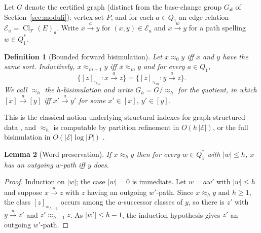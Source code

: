 \documentclass[11pt]{article}
\newtheorem{definition}{Definition}[section]
\newtheorem{lemma}[definition]{Lemma}
\newcommand{\Cl}{\operatorname{Cl}}
\newcommand{\T}{\mathcal{T}}
\begin{document}
Let $G$ denote the certified graph (distinct from the base-change group $G_{\bm d}$ of Section~\ref{sec:moduli}): vertex set $P$, and for each $a\in Q_1$ an edge relation $\mathcal{E}_a=\Cl_{\T}(E)_a$. Write $x\xrightarrow{a}y$ for $(x,y)\in\mathcal{E}_a$ and $x\xrightarrow{w}y$ for a path spelling $w\in Q_1^{\ast}$.

\begin{definition}[Bounded forward bisimulation]
\label{def:hbisim}
Let $x\approx_0 y$ iff $x$ and $y$ have the same sort. Inductively, $x\approx_{m+1}y$ iff $x\approx_m y$ and for every $a\in Q_1$,
\[
\bigl\{[z]_{\approx_m} : x\xrightarrow{a}z\bigr\}
=\bigl\{[z]_{\approx_m} : y\xrightarrow{a}z\bigr\}.
\]
We call $\approx_h$ the $h$-bisimulation and write $G_h=G/\!\approx_h$ for the quotient, in which $[x]\xrightarrow{a}[y]$ iff $x'\xrightarrow{a}y'$ for some $x'\in[x]$, $y'\in[y]$.
\end{definition}

This is the classical notion underlying structural indexes for graph-structured data \citep{kaushik2002}, and $\approx_h$ is computable by partition refinement in $O(h\,|\mathcal{E}|)$, or the full bisimulation in $O(|\mathcal{E}|\log|P|)$ \citep{paige1987}.

\begin{lemma}[Word preservation]
\label{lem:word}
If $x\approx_h y$ then for every $w\in Q_1^{\ast}$ with $|w|\le h$, $x$ has an outgoing $w$-path iff $y$ does.
\end{lemma}
\begin{proof}
Induction on $|w|$; the case $|w|=0$ is immediate. Let $w=aw'$ with $|w|\le h$ and suppose $x\xrightarrow{a}z$ with $z$ having an outgoing $w'$-path. Since $x\approx_h y$ and $h\ge1$, the class $[z]_{\approx_{h-1}}$ occurs among the $a$-successor classes of $y$, so there is $z'$ with $y\xrightarrow{a}z'$ and $z'\approx_{h-1}z$. As $|w'|\le h-1$, the induction hypothesis gives $z'$ an outgoing $w'$-path.
\end{proof}
\end{document}
